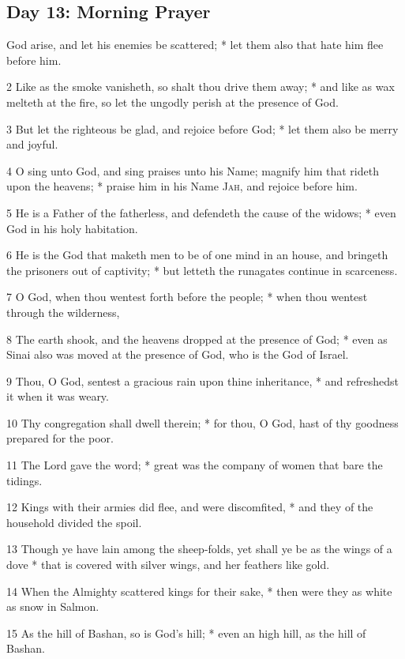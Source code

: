 \subsection{Day 13: Morning Prayer}
 God arise, and let his enemies be scattered; * let them also that hate him flee before him.\par
2 Like as the smoke vanisheth, so shalt thou drive them away; * and like as wax melteth at the fire, so let the ungodly perish at the presence of God.\par
3 But let the righteous be glad, and rejoice before God; * let them also be merry and joyful.\par
4 O sing unto God, and sing praises unto his Name; magnify him that rideth upon the heavens; * praise him in his Name \textsc{Jah}, and rejoice before him.\par
5 He is a Father of the fatherless, and defendeth the cause of the widows; * even God in his holy habitation.\par
6 He is the God that maketh men to be of one mind in an house, and bringeth the prisoners out of captivity; * but letteth the runagates continue in scarceness.\par
7 O God, when thou wentest forth before the people; * when thou wentest through the wilderness,\par
8 The earth shook, and the heavens dropped at the presence of God; * even as Sinai also was moved at the presence of God, who is the God of Israel.\par
9 Thou, O God, sentest a gracious rain upon thine inheritance, * and refreshedst it when it was weary.\par
10 Thy congregation shall dwell therein; * for thou, O God, hast of thy goodness prepared for the poor.\par
11 The Lord gave the word; * great was the company of women that bare the tidings.\par
12 Kings with their armies did flee, and were discomfited, * and they of the household divided the spoil.\par
13 Though ye have lain among the sheep-folds, yet shall ye be as the wings of a dove * that is covered with silver wings, and her feathers like gold.\par
14 When the Almighty scattered kings for their sake, * then were they as white as snow in Salmon.\par
15 As the hill of Bashan, so is God's hill; * even an high hill, as the hill of Bashan.\par
